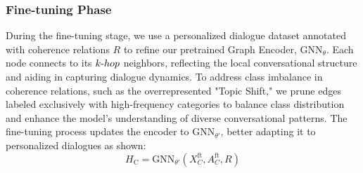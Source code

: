 \documentclass[letterpaper]{article} %
\begin{document}
\subsubsection{Fine-tuning Phase}
During the fine-tuning stage, we use a personalized dialogue dataset annotated with coherence relations $R$ to refine our pretrained Graph Encoder, $\text{GNN}_{\theta}$. Each node connects to its $k{\text -}hop$ neighbors, reflecting the local conversational structure and aiding in capturing dialogue dynamics. To address class imbalance in coherence relations, such as the overrepresented "Topic Shift," we prune edges labeled exclusively with high-frequency categories to balance class distribution and enhance the model's understanding of diverse conversational patterns. The fine-tuning process updates the encoder to $\text{GNN}_{\theta'}$, better adapting it to personalized dialogues as shown:
\begin{equation}\label{eq:gnn_ft_enc}
    H_{\text{C}} = \text{GNN}_{\theta'}(X_{C}^{\text{ft}}, A_{C}^{\text{ft}}, R)
\end{equation}
\end{document}
